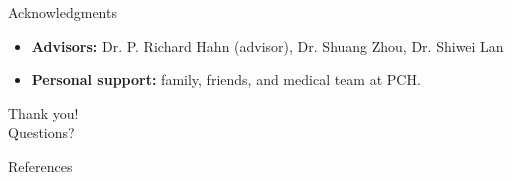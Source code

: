 \documentclass[aspectratio=169,professionalfonts]{beamer}
\begin{document}
\begin{frame}{Acknowledgments}
\small 
\begin{itemize}
  \item \textbf{Advisors:} Dr. P. Richard Hahn (advisor), Dr.  Shuang Zhou, Dr. Shiwei Lan 
  \item \textbf{Personal support:} family, friends, and medical team at PCH.
\end{itemize}
\end{frame}

\begin{frame}[plain]
  \centering\Huge Thank you!\\[1ex]\Large Questions?
\end{frame}

\begin{frame}[allowframebreaks]{References}
\footnotesize

\end{frame}
\end{document}
